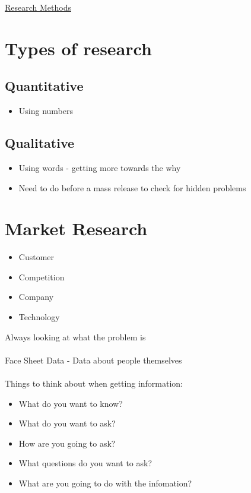\documentclass{article}[18pt]
\begin{document}
\begin{center}
\underline{\huge Research Methods}
\end{center}


\section{Types of research}
\subsection{Quantitative}
\begin{itemize}
	\item Using numbers
\end{itemize}

\subsection{Qualitative}
\begin{itemize}
	\item Using words - getting more towards the why
	\item Need to do before a mass release to check for hidden problems
\end{itemize}

\section{Market Research}
\begin{itemize}
	\item Customer
	\item Competition
	\item Company
	\item Technology
\end{itemize}
Always looking at what the problem is\\
\\
Face Sheet Data - Data about people themselves\\
\\
Things to think about when getting information:
\begin{itemize}
	\item What do you want to know?
	\item What do you want to ask?
	\item How are you going to ask?
	\item What questions do you want to ask?
	\item What are you going to do with the infomation?
\end{itemize}
\end{document}

